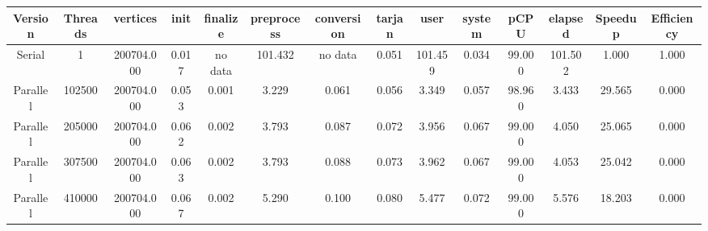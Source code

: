 \begin{tabular}{|c|c|c|c|c|c|c|c|c|c|c|c|c|c|}
\toprule
 Version &  Threads &   vertices &  init & finalize &  preprocess & conversion &  tarjan &    user &  system &   pCPU &  elapsed &  Speedup &  Efficiency \\
\midrule
  Serial &        1 & 200704.000 & 0.017 &  no data &     101.432 &    no data &   0.051 & 101.459 &   0.034 & 99.000 &  101.502 &    1.000 &       1.000 \\
Parallel &   102500 & 200704.000 & 0.053 &    0.001 &       3.229 &      0.061 &   0.056 &   3.349 &   0.057 & 98.960 &    3.433 &   29.565 &       0.000 \\
Parallel &   205000 & 200704.000 & 0.062 &    0.002 &       3.793 &      0.087 &   0.072 &   3.956 &   0.067 & 99.000 &    4.050 &   25.065 &       0.000 \\
Parallel &   307500 & 200704.000 & 0.063 &    0.002 &       3.793 &      0.088 &   0.073 &   3.962 &   0.067 & 99.000 &    4.053 &   25.042 &       0.000 \\
Parallel &   410000 & 200704.000 & 0.067 &    0.002 &       5.290 &      0.100 &   0.080 &   5.477 &   0.072 & 99.000 &    5.576 &   18.203 &       0.000 \\
\bottomrule
\end{tabular}
